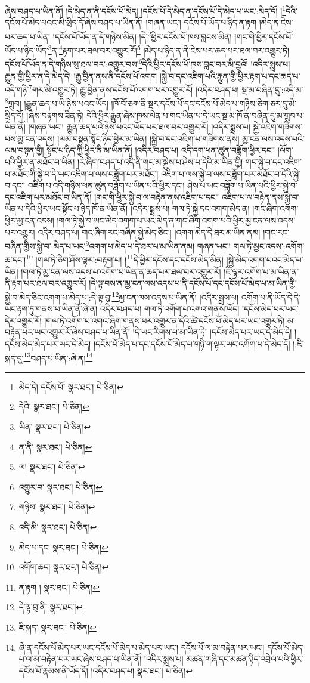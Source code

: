 ཞེས་བཤད་པ་ཡིན་ནོ། །དེ་མེད་ན་ནི་དངོས་པོ་མེད། །དངོས་པོ་དེ་མེད་ན་དངོས་པོ་དེ་མེད་པ་ཡང་:མེད་དོ། །\footnote{མེད་དེ། དངོས་པོ་  སྣར་ཐང་།  པེ་ཅིན། }དེའི་དངོས་པོ་མེད་པའང་མི་སྲིད་དོ་ཞེས་བཤད་པ་ཡིན་ནོ། །གཞན་ཡང་། དངོས་པོ་ཡོད་པ་ཉིད་ན་རྟག །མེད་ན་ངེས་པར་ཆད་པ་ཡིན། །དངོས་པོ་ཡོད་ན་དེ་གཉིས་མིན། །དེ་\footnote{དེའི་  སྣར་ཐང་།  པེ་ཅིན། }ཕྱིར་དངོས་པོ་ཁས་བླངས་མིན། །གང་གི་ཕྱིར་དངོས་པོ་ཡོད་པ་ཉིད་ཡོད་\footnote{ཡིན་  སྣར་ཐང་།  པེ་ཅིན། }ན་\footnote{ན་ནི་  སྣར་ཐང་།  པེ་ཅིན། }རྟག་པར་ཐལ་བར་འགྱུར་རོ།\footnote{ལ།  སྣར་ཐང་།  པེ་ཅིན། } །མེད་པ་ཉིད་ན་ནི་ངེས་པར་ཆད་པར་ཐལ་བར་འགྱུར་ཏེ། དངོས་པོ་ཡོད་ན་དེ་གཉིས་སུ་ཐལ་བར་:འགྱུར་བས་\footnote{འགྱུར་བ་  སྣར་ཐང་།  པེ་ཅིན། }དེའི་ཕྱིར་དངོས་པོ་ཁས་བླང་བར་མི་བྱའོ། །འདིར་སྨྲས་པ། རྒྱུན་གྱི་ཕྱིར་ན་དེ་མེད་དེ། །རྒྱུ་བྱིན་ནས་ནི་དངོས་པོ་འགག །སྐྱེ་བ་དང་འཇིག་པའི་རྒྱུན་གྱི་ཕྱིར་རྟག་པ་དང་ཆད་པ་འདི་གཉི་\footnote{གཉིས་  སྣར་ཐང་།  པེ་ཅིན། }གར་མི་འགྱུར་ཏེ། རྒྱུ་བྱིན་ནས་དངོས་པོ་འགག་པར་འགྱུར་རོ། །འདིར་བཤད་པ། སྔ་མ་བཞིན་དུ་:འདི་མ་\footnote{འདི་མི་  སྣར་ཐང་།  པེ་ཅིན། }གྲུབ། །རྒྱུན་ཆད་པ་ཡི་ཉེས་པའང་ཡོད། །ཁོ་བོ་ཅག་ནི་སྔར་དངོས་པོ་དང་དངོས་པོ་མེད་པ་གཉིས་ཅིག་ཅར་དུ་མི་སྲིད་དོ། །ཞེས་བརྟགས་ཟིན་ཏེ། དེའི་ཕྱིར་རྒྱུན་ཞེས་ཁས་ལེན་པ་གང་ཡིན་པ་དེ་ཡང་སྔ་མ་ཁོ་ན་བཞིན་དུ་མ་གྲུབ་པ་ཡིན་ནོ། །གཞན་ཡང་། རྒྱུན་ཆད་པའི་ཉེས་པའང་ཡོད་པར་ཐལ་བར་འགྱུར་རོ། །འདིར་སྨྲས་པ། སྐྱེ་འཇིག་གཟིགས་པས་མྱ་ངན་འདས། །ལམ་བསྟན་སྟོང་ཉིད་ཕྱིར་མ་ཡིན། །སྐྱེ་བ་དང་འཇིག་པ་གཟིགས་ནས། མྱ་ངན་ལས་འདས་པའི་ལམ་བསྟན་གྱི། སྟོང་པ་ཉིད་ཀྱི་ཕྱིར་ནི་མ་ཡིན་ནོ། །འདིར་བཤད་པ། འདི་དག་ཕན་ཚུན་བཟློག་ཕྱིར་དང་། །ལོག་པའི་ཕྱིར་ན་མཐོང་བ་ཡིན། །རེ་ཞིག་བཤད་པ་འདི་ནི་གང་མ་སྐྱེས་པ་ཤེས་པ་དེའི་མ་ཡིན་གྱི། གང་སྐྱེ་བ་དང་འཇིག་པ་མཐོང་གི་སྐྱེ་བ་དེ་ཡང་འཇིག་པ་ལས་བཟློག་པར་མཐོང་། འཇིག་པ་ལས་སྐྱེ་བ་ལས་བཟློག་པར་མཐོང་བ་དེའི་སྐྱེ་བ་དང་། འཇིག་པ་འདི་གཉིས་ཕན་ཚུན་བཟློག་པ་ཡིན་པའི་ཕྱིར་དང་། ཤེས་པ་ཡང་བཟློག་པ་ཡིན་པའི་ཕྱིར་སྐྱེ་བ་དང་འཇིག་པར་མཐོང་བ་ཡིན་ནོ། །གང་གི་ཕྱིར་སྐྱེ་བ་ལ་བརྟེན་ནས་འཇིག་པ་དང་། འཇིག་པ་ལ་བརྟེན་ནས་སྐྱེ་བ་ཡིན་པ་དེའི་ཕྱིར་ཡང་སྟོང་པ་ཉིད་ཁོ་ན་ཡིན་ནོ། །འདིར་སྨྲས་པ། གལ་ཏེ་སྐྱེ་དང་འགག་མེད་ན། །གང་ཞིག་འགག་ཕྱིར་མྱ་ངན་འདས། །གལ་ཏེ་སྐྱེ་བ་ཡང་མེད་འགག་པ་ཡང་མེད་ན་གང་ཞིག་འགག་པའི་ཕྱིར་མྱ་ངན་ལས་འདས་པར་འགྱུར། འདིར་བཤད་པ། གང་ཞིག་རང་བཞིན་སྐྱེ་མེད་ཅིང་། །འགག་མེད་དེ་ཐར་མ་ཡིན་ནམ། །གང་རང་བཞིན་གྱིས་སྐྱེ་བ་:མེད་པ་ཡང་\footnote{མེད་པ་དང་  སྣར་ཐང་།  པེ་ཅིན། }འགག་པ་མེད་པ་དེ་ཐར་པ་མ་ཡིན་ནམ། གཞན་ཡང་། གལ་ཏེ་མྱང་འདས་:འགོག་ཆ་དང་།\footnote{འགོག་ཆད།  སྣར་ཐང་།  པེ་ཅིན། } །གལ་ཏེ་ཅིག་ཤོས་ལྟར་:བརྟག་པ། །\footnote{ན་རྟག །  སྣར་ཐང་།  པེ་ཅིན། }དེ་ཕྱིར་དངོས་དང་དངོས་མེད་མིན། །སྐྱེ་མེད་འགག་པའང་མེད་པ་ཡིན། །གལ་ཏེ་མྱ་ངན་ལས་འདས་པ་འགོག་པ་ཡིན་ན་ཆད་པར་ཐལ་བར་འགྱུར་རོ། །ཇི་ལྟར་འགོག་པ་མ་ཡིན་ན་ནི་རྟག་པར་ཐལ་བར་འགྱུར་རོ། །དེ་ལྟ་བས་ན་མྱ་ངན་ལས་འདས་པ་ནི་དངོས་པོ་དང་དངོས་པོ་མེད་པ་མ་ཡིན་གྱི། སྐྱེ་བ་མེད་ཅིང་འགག་པ་མེད་པ་:དེ་ལྟ་བུ་\footnote{དེ་ལྟ་བུ་ནི་  སྣར་ཐང་། }མྱ་ངན་ལས་འདས་པ་ཡིན་ནོ། །འདིར་སྨྲས་པ། འགོག་པ་ནི་ཡོད་དེ་དེ་ཡང་རྟག་ཏུ་གནས་པ་ཡིན་ནོ་ཞེ་ན། འདིར་བཤད་པ། གལ་ཏེ་འགོག་པ་འགའ་གནས་ཡོད། །དངོས་མེད་པར་ཡང་དེར་འགྱུར་རོ། །གལ་ཏེ་འགོག་པ་འགའ་ཞིག་གནས་པར་འགྱུར་ན་དེའི་ཚེ་དངོས་པོ་མེད་པར་ཡང་འགྱུར་ཏེ། མ་བརྟེན་པར་ཡང་འགྱུར་རོ་ཞེས་བཤད་པ་ཡིན་ནོ། །དེ་ཡང་རིགས་པ་མ་ཡིན་ཏེ། །དངོས་མེད་པར་ཡང་དེ་མེད་དེ། །དངོས་མེད་མེད་པར་ཡང་དེ་མེད། །དངོས་པོ་མེད་པ་དང་དངོས་པོ་མེད་པ་གཉི་ག་ལྟར་ཡང་འགོག་པ་དེ་མེད་དོ། །:ཇི་སྐད་དུ་\footnote{ཇི་སྐད་  སྣར་ཐང་།  པེ་ཅིན། }བཤད་པ་ཡིན་:ཞེ་ན།\footnote{ཞེ་ན་དངོས་པོ་མེད་པར་ཡང་དངོས་པོ་མེད་པ་མེད་པར་ཡང་། དངོས་པོ་ལ་མ་བརྟེན་པར་ཡང་། དངོས་པོ་མེད་པ་ལ་མ་བརྟེན་པར་ཡང་ཞེས་བཤད་པ་ཡིན་ནོ། །འདིར་སྨྲས་པ། མཚན་གཞི་དང་མཚན་ཉིད་འབྲེལ་པའི་ཕྱིར་དངོས་པོ་རྣམས་ནི་ཡོད་དོ། །འདིར་བཤད་པ།  སྣར་ཐང་།  པེ་ཅིན། } 